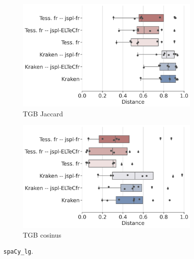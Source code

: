 \begin{figure}
   \centering
         \begin{subfigure}{0.45\textwidth}
  \includegraphics[height=.65\textwidth]{IMAGES/Boite-moustache/TGB_spaCy3.5.1_jaccard.png} 
        \caption{TGB Jaccard}
   \end{subfigure}
    \begin{subfigure}{0.5\textwidth}
  \includegraphics[height=.65\textwidth]{IMAGES/Boite-moustache/TGB_spaCy3.5.1_cosinus.png} 
        \caption{TGB cosinus}
   \end{subfigure}
   
    \caption{\texttt{spaCy\_lg}.}
    \label{fig:spaCy3.5.1-lg}
\end{figure}

